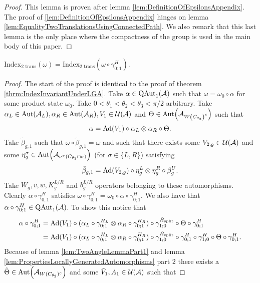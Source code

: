 \documentclass[11pt,a4paper,twoside]{article}
\numberwithin{equation}{section}
\begin{document}
\begin{proof}
	This lemma is proven after lemma \ref{lem:DefinitionOfEpsilonsAppendix}. The proof of \ref{lem:DefinitionOfEpsilonsAppendix} hinges on lemma \ref{lem:EqualityTwoTranslationsUsingConnectedPath}. We also remark that this last lemma is the only place where the compactness of the group is used in the main body of this paper.
\end{proof}
\begin{theorem}
	$\textrm{Index}_{\text{2 trans}}(\omega)=\textrm{Index}_{\text{2 trans}}(\omega\circ\gamma^H_{0;1}).$
\end{theorem}
\begin{proof}
	The start of the proof is identical to the proof of theorem \ref{thrm:IndexInvariantUnderLGA}. Take $\alpha\in\QAut{\AA}$ such that $\omega=\omega_0\circ\alpha$ for some product state $\omega_0$. Take $0<\theta_1<\theta_2<\theta_3<\pi/2$ arbitrary. Take $\alpha_L\in\Aut{\AA_L},\alpha_R\in\Aut{\AA_R},V_1\in\UU(\AA)$ and $\Theta\in\Aut{\AA_{W\left(C_{\theta_3}\right)^c}}$ such that
	\begin{equation}
		\alpha=\Ad{V_1}\circ\alpha_L\otimes\alpha_R\circ\Theta.
	\end{equation}
	Take $\tilde{\beta}_{g,1}$ such that $\omega\circ\tilde{\beta}_{g,1}=\omega$ and such that there exists some $V_{2,g}\in\mathcal U(\mathcal A)$ and some $\eta_g^{\sigma}\in\Aut{\AA_{\nu^{\sigma}(C_{\theta_1}\cap\sigma)}}$ (for $\sigma\in\{L,R\}$) satisfying
	\begin{equation}
		\tilde{\beta}_{g,1}=\Ad{V_{2,g}}\circ\eta_{g}^L\otimes\eta_{g}^R\circ\beta_g^U.
	\end{equation}
	Take $W_g,v,w,K_g^{L/R}$ and $b_g^{L/R}$ operators belonging to these automorphisms. Clearly $\alpha\circ\gamma^H_{0;1}$ satisfies $\omega\circ\gamma^{H}_{0;1}=\omega_0\circ\alpha\circ\gamma^{H}_{0;1}$. We also have that $\alpha\circ\gamma^H_{0;1}\in\QAut{\AA}$. To show this notice that
	\begin{align}
		\alpha\circ\gamma^H_{0;1}&=\Ad{V_1}\circ(\alpha_L\circ\gamma^{H_L}_{0;1}\otimes\alpha_R\circ\gamma^{H_R}_{0;1})\circ\gamma^{\HsplitTilde}_{1;0}\circ\Theta\circ\gamma^H_{0;1}\\
		&=\Ad{V_1}\circ(\alpha_L\circ\gamma^{H_L}_{0;1}\otimes\alpha_R\circ\gamma^{H_R}_{0;1})\circ\gamma^{\HsplitTilde}_{1;0}\circ\gamma^{H}_{0;1}\circ\gamma^{H}_{1;0}\circ\Theta\circ\gamma^H_{0;1}.
	\end{align}
	Because of lemma \ref{lem:TwoAngleLemmaPart1} and lemma \ref{lem:PropertiesLocallyGeneratedAutomorphisms} part 2 there exists a $\tilde{\Theta}\in\Aut{\AA_{W(C_{\theta_2})^c}}$ and some $\tilde V_1,A_1\in\mathcal U(\mathcal A)$ such that

\end{proof}
\end{document}
